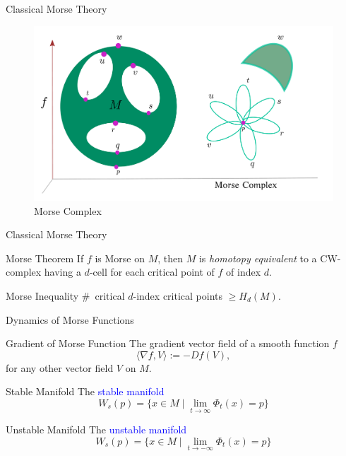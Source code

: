 \documentclass[9pt,sans-serif]{beamer}
\begin{document}
\begin{frame}{Classical Morse Theory}
  \begin{figure}
    \centering
    \includegraphics[scale=0.2]{5}
    \caption{Morse Complex}
  \end{figure}
\end{frame}

\begin{frame}{Classical Morse Theory}
  \begin{block}{Morse Theorem}
    If $f$ is Morse on $M$, then $M$ is \emph{homotopy equivalent} to a
    CW-complex having a $d$-cell for each critical point of $f$ of index $d$.
  \end{block}

  \pause
  
  \begin{block}{Morse Inequality}
    \#~critical $d$-index critical points $\geq H_d(M)$.
  \end{block}
\end{frame}


\begin{frame}{Dynamics of Morse Functions}
  \begin{block}{Gradient of Morse Function}  
    The gradient vector field of a smooth function $f$
    $$\langle\nabla f,V\rangle:=-Df(V),$$
    for any other vector field $V$ on $M$.
  \end{block}

  \pause
  
  \begin{block}{Stable Manifold}
    The \textcolor{blue}{stable manifold} $$W_s(p)=\{x\in
    M\mid\lim_{t\to\infty}\Phi_t(x)=p\}$$
  \end{block}

  \pause
  
  \begin{block}{Unstable Manifold}
    The \textcolor{blue}{unstable manifold} $$W_s(p)=\{x\in
    M\mid\lim_{t\to-\infty}\Phi_t(x)=p\}$$
  \end{block}  
  
\end{frame}
\end{document}
